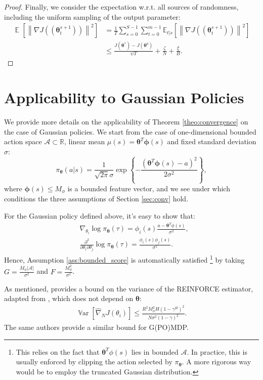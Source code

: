 \documentclass{article}
\makeatletter
\theoremstyle{remark}
\theoremstyle{definition}
\DeclareRobustCommand{\wrt}{w.r.t.\@\xspace}
\DeclareMathOperator*{\EV}{\mathbb{E}}
\DeclareMathOperator*{\Var}{\mathbb{V}ar}
\newcommand{\EVV}[2][\ppvect \in \ppspace]{\EV_{#1}\left[{#2}\right]}
\newcommand{\norm}[2][\infty]{\left\|#2\right\|_{#1}}
\newcommand{\vtheta}{\boldsymbol{\theta}}
\newcommand{\Aspace}{\mathcal{A}}
\newcommand{\vphi}{\boldsymbol{\phi}}
\newcommand{\gradJ}[1]{\nabla J(#1)}
\newcommand{\gradApp}[2]{\widehat{\nabla}_{#2}J(#1)}
\newcommand{\Ets}[2][t]{\mathbb{E}_{#1\vert s}\left[#2\right]}
\newcommand{\GRADLOG}{G}
\newcommand{\HESSLOG}{F}
\makeatother
\begin{document}
\begin{proof}
Finally, we consider the expectation \wrt all sources of randomness, including the uniform sampling of the output parameter:
\begin{align}
\EVV[]{\norm[]{\gradJ{(\vtheta_t^{s+1})}}^2} 
&=\frac{1}{T}\sum_{s=0}^{S-1}\sum_{t=0}^{m-1}\Ets{\norm[]{\gradJ{(\vtheta_t^{s+1})}}^2} \nonumber\\
&\leq
\frac{J(\vtheta^*) - J(\vtheta^0)}{\psi T} + \frac{\zeta}{N} + \frac{\xi}{B} \nonumber.
\end{align}
\end{proof}


\section{Applicability to Gaussian Policies}\label{app:gauss}
We provide more details on the applicability of Theorem \ref{theo:convergence} on the case of Gaussian policies. We start from the case of one-dimensional bounded action space $\mathcal{A}\subset\mathbb{R}$, linear mean $\mu(s) = \vtheta^T\vphi(s)$ and fixed standard deviation $\sigma$:
\[
	\pi_{\vtheta}(a\vert s) = \frac{1}{\sqrt{2\pi}\sigma}\exp\left\{
		-\frac{(\vtheta^T\vphi(s) - a)^2}{2\sigma^2}\right\},
\]
where $\vphi(s)\leq M_{\phi}$ is a bounded feature vector, and we see under which conditions the three assumptions of Section \ref{sec:conv} hold.

\boundedscore*
For the Gaussian policy defined above, it's easy to show that:
\begin{align*}
	&\nabla_{\theta_i}\log\pi_{\vtheta}(\tau) =  \phi_i(s)\frac{a-\vtheta^T\phi(s)}{\sigma^2},\\
	&\frac{\partial^2}{\partial\theta_i\partial\theta_j}\log\pi_{\vtheta}(\tau) = \frac{\phi_i(s)\phi_j(s)}{\sigma^2}.
\end{align*}
Hence, Assumption \ref{ass:bounded_score} is automatically satisfied \footnote{This relies on the fact that $\vtheta^T\phi(s)$ lies in bounded $\Aspace$. In practice, this is usually enforced by clipping the action selected by $\pi_{\vtheta}$. A more rigorous way would be to employ the truncated Gaussian distribution.} by taking $\GRADLOG = \frac{M_{\phi}|\Aspace|}{\sigma^2}$ and $\HESSLOG = \frac{M_{\phi}^2}{\sigma^2}$.
\par
\varreinforce*
As mentioned, \cite{pirotta2013adaptive} provides a bound on the variance of the REINFORCE estimator, adapted from \cite{zhao2011analysis}, which does not depend on $\vtheta$:
\begin{align*}
\Var\left[\gradApp{\theta_i}{N}\right] \leq \frac{R^2M_{\phi}^2H(1-\gamma^H)^2}{N\sigma^2(1-\gamma)^2}.
\end{align*}
The same authors provide a similar bound for G(PO)MDP.
\end{document}
